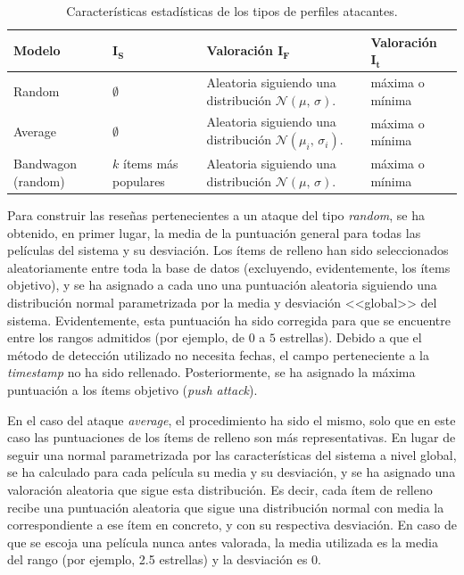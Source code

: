 \begin{table}
\begin{centering}
	\begin{tabular}{@{}p{5em} p{5em} p{11em} p{9em}@{}}
		\toprule
		\textbf{Modelo} & $\mathbf{I_S}$ & \textbf{Valoración} $\mathbf{I_F}$ &  \textbf{Valoración} $\mathbf{I_t}$\\ 
		\midrule
		Random & $\emptyset$ & Aleatoria siguiendo una distribución $\mathcal{N}(\mu,\,\sigma)$. & máxima o mínima \\
		Average & $\emptyset$ & Aleatoria siguiendo una distribución $\mathcal{N}(\mu_i,\,\sigma_i)$. & máxima o mínima\\
		Bandwagon (random) & $k$ ítems más populares & Aleatoria siguiendo una distribución $\mathcal{N}(\mu,\,\sigma)$. & máxima o mínima\\
		\bottomrule
	\end{tabular}
	\caption{Características estadísticas de los tipos de perfiles atacantes.}
	\label{ataques_coforest}	
\end{centering}
\end{table}

Para construir las reseñas pertenecientes a un ataque del tipo \textit{random}, se ha obtenido, en primer lugar, la media de la puntuación general para todas las películas del sistema y su desviación. Los ítems de relleno han sido seleccionados aleatoriamente entre toda la base de datos (excluyendo, evidentemente, los ítems objetivo), y se ha asignado a cada uno una puntuación aleatoria siguiendo una distribución normal parametrizada por la media y desviación <<global>> del sistema. Evidentemente, esta puntuación ha sido corregida para que se encuentre entre los rangos admitidos (por ejemplo, de $0$ a $5$ estrellas). Debido a que el método de detección utilizado no necesita fechas, el campo perteneciente a la \textit{timestamp} no ha sido rellenado. Posteriormente, se ha asignado la máxima puntuación a los ítems objetivo (\textit{push attack}).

En el caso del ataque \textit{average}, el procedimiento ha sido el mismo, solo que en este caso las puntuaciones de los ítems de relleno son más representativas. En lugar de seguir una normal parametrizada por las características del sistema a nivel global, se ha calculado para cada película su media y su desviación, y se ha asignado una valoración aleatoria que sigue esta distribución. Es decir, cada ítem de relleno recibe una puntuación aleatoria que sigue una distribución normal con media la correspondiente a ese ítem en concreto, y con su respectiva desviación. En caso de que se escoja una película nunca antes valorada, la media utilizada es la media del rango (por ejemplo, 2.5 estrellas) y la desviación es $0$.

